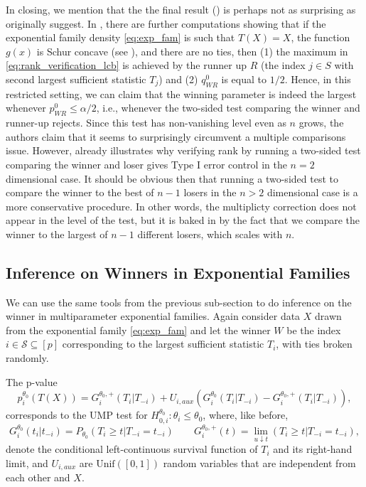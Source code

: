 \documentclass{article}
\begin{document}
In closing, we mention that the the final result () is perhaps not as surprising as \cite{Hung2019} originally suggest. In \cite{Hung2019}, there are further computations showing that if the exponential family density \eqref{eq:exp_fam} is such that $T(X) = X$, the function $g(x)$ is Schur concave (see \cite[Definition 2]{Fithian}), and there are no ties, then (1) the maximum in \eqref{eq:rank_verification_lcb} is achieved by the runner up $R$ (the index $j \in S$ with second largest sufficient statistic $T_j$) and (2) $q^{0}_{WR}$ is equal to $1/2$. Hence, in this restricted setting, we can claim that the winning parameter is indeed the largest whenever $p^{0}_{WR} \leq \alpha/2$, i.e., whenever the two-sided test comparing the winner and runner-up rejects. Since this test has non-vanishing level even as $n$ grows, the authors claim that it seems to surprisingly circumvent a multiple comparisons issue. However,  already illustrates why verifying rank by running a two-sided test comparing the winner and loser gives Type I error control in the $n=2$ dimensional case. It should be obvious then that running a two-sided test to compare the winner to the best of $n-1$ losers in the $n > 2$ dimensional case is a more conservative procedure. In other words, the multiplicty correction does not appear in the level of the test, but it is baked in by the fact that we compare the winner to the largest of $n-1$ different losers, which scales with $n$. 

\subsection{Inference on Winners in Exponential Families}

We can use the same tools from the previous sub-section  to do inference on the winner in multiparameter exponential families. Again consider data $X$ drawn from the exponential family \eqref{eq:exp_fam} and let the winner $W$ be the index $i \in \mathcal{S} \subseteq [p]$ corresponding to the largest sufficient statistic $T_i$, with ties broken randomly.

The p-value 
\begin{equation}
    \label{eq:ump_exp_fam}
    p_i^{\theta_0}(T(X)) = G^{\theta_0, +}_i(T_i|T_{-i}) + U_{i, aux}(G^{\theta_0}_i(T_i|T_{-i}) - G^{\theta_0, +}_i(T_i|T_{-i})),
\end{equation}
corresponds to the UMP test for $H_{0, i}^{\theta_0}: \theta_i \leq \theta_0$, where, like before,
\begin{equation*}
    G^{\theta_0}_i(t_i | t_{-i}) = P_{\theta_0}(T_i \geq t | T_{-i} = t_{-i}) \qquad G^{\theta_0, +}_i(t) = \lim_{u \downarrow t}(T_i \geq t | T_{-i} = t_{-i} ),
\end{equation*}
denote the conditional left-continuous survival function of $T_i$ and its right-hand limit, and $U_{i, aux}$ are $\text{Unif}([0,1])$ random variables that are independent from each other and $X$.
\end{document}
